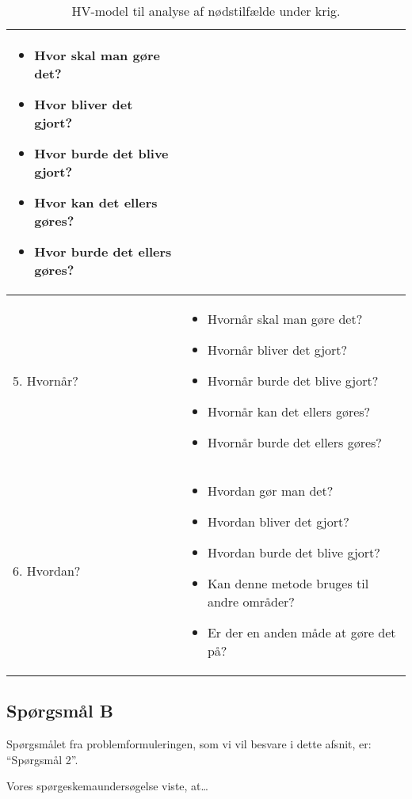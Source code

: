 \begin{table}[H]
\begin{tabular}{|p{4cm}|p{10cm}|}
        \begin{itemize}
            \item Hvor skal man gøre det?
            \item Hvor bliver det gjort?
            \item Hvor burde det blive gjort?
            \item Hvor kan det ellers gøres?
            \item Hvor burde det ellers gøres?
        \end{itemize} \\
        \hline
        5. Hvornår? &
        \begin{itemize}
            \item Hvornår skal man gøre det?
            \item Hvornår bliver det gjort?
            \item Hvornår burde det blive gjort?
            \item Hvornår kan det ellers gøres?
            \item Hvornår burde det ellers gøres?
        \end{itemize} \\
        \hline
        6. Hvordan? &
        \begin{itemize}
            \item Hvordan gør man det?
            \item Hvordan bliver det gjort?
            \item Hvordan burde det blive gjort?
            \item Kan denne metode bruges til andre områder?
            \item Er der en anden måde at gøre det på?
        \end{itemize} \\
        \hline
    \end{tabular}
    \caption{HV-model til analyse af nødstilfælde under krig.}
    \label{tab:hv-model}
\end{table}

\subsection{Spørgsmål B}
Spørgsmålet fra problemformuleringen, som vi vil besvare i dette afsnit, er: ``Spørgsmål 2''.

Vores spørgeskemaundersøgelse viste, at\ldots